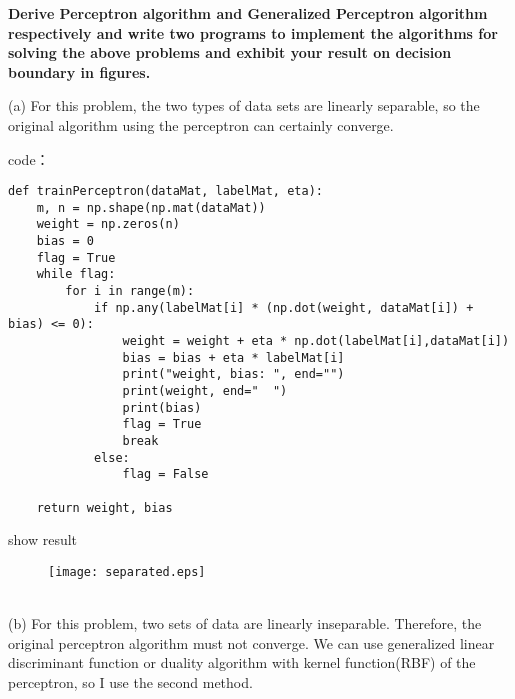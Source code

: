 \noindent\textbf{Derive Perceptron algorithm and Generalized Perceptron algorithm respectively and write two programs
to implement the algorithms for solving the above problems and exhibit your result on decision boundary
in figures.}

\noindent(a) For this problem, the two types of data sets are linearly separable, so the original algorithm using the perceptron can certainly converge.

\noindent code：
\begin{lstlisting}
def trainPerceptron(dataMat, labelMat, eta):
    m, n = np.shape(np.mat(dataMat))
    weight = np.zeros(n)
    bias = 0
    flag = True
    while flag:
        for i in range(m):
            if np.any(labelMat[i] * (np.dot(weight, dataMat[i]) + bias) <= 0):
                weight = weight + eta * np.dot(labelMat[i],dataMat[i])
                bias = bias + eta * labelMat[i]
                print("weight, bias: ", end="")
                print(weight, end="  ")
                print(bias)
                flag = True
                break
            else:
                flag = False

    return weight, bias
\end{lstlisting}

\noindent show result
\begin{figure}[!h]
  \centering
  \texttt{[image: separated.eps]}
\end{figure}

~\\

\noindent(b) For this problem, two sets of data  are linearly inseparable. Therefore, the original perceptron algorithm must not converge. We can use generalized linear discriminant function or duality algorithm with kernel function(RBF) of the perceptron, so I use the second method.

